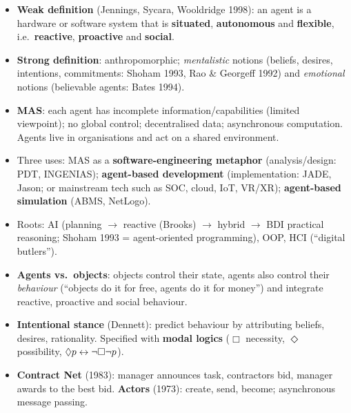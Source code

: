 \begin{nbsummary}
\begin{itemize}[nosep]
  \item \textbf{Weak definition} (Jennings, Sycara, Wooldridge 1998): an agent is a hardware
        or software system that is \textbf{situated}, \textbf{autonomous} and
        \textbf{flexible}, i.e.\ \textbf{reactive}, \textbf{proactive} and \textbf{social}.
  \item \textbf{Strong definition}: anthropomorphic; \emph{mentalistic} notions (beliefs,
        desires, intentions, commitments: Shoham 1993, Rao \& Georgeff 1992) and
        \emph{emotional} notions (believable agents: Bates 1994).
  \item \textbf{MAS}: each agent has incomplete information/capabilities (limited
        viewpoint); no global control; decentralised data; asynchronous computation.
        Agents live in organisations and act on a shared environment.
  \item Three uses: MAS as a \textbf{software-engineering metaphor} (analysis/design: PDT,
        INGENIAS); \textbf{agent-based development} (implementation: JADE, Jason; or
        mainstream tech such as SOC, cloud, IoT, VR/XR); \textbf{agent-based simulation}
        (ABMS, NetLogo).
  \item Roots: AI (planning $\to$ reactive (Brooks) $\to$ hybrid $\to$ BDI practical
        reasoning; Shoham 1993 = agent-oriented programming), OOP, HCI (``digital
        butlers'').
  \item \textbf{Agents vs.\ objects}: objects control their state, agents also control
        their \emph{behaviour} (``objects do it for free, agents do it for money'') and
        integrate reactive, proactive and social behaviour.
  \item \textbf{Intentional stance} (Dennett): predict behaviour by attributing beliefs,
        desires, rationality. Specified with \textbf{modal logics} ($\Box$ necessity,
        $\Diamond$ possibility, $\Diamond p \leftrightarrow \neg\Box\neg p$).
  \item \textbf{Contract Net} (1983): manager announces task, contractors bid, manager
        awards to the best bid. \textbf{Actors} (1973): create, send, become; asynchronous
        message passing.
\end{itemize}
\end{nbsummary}
